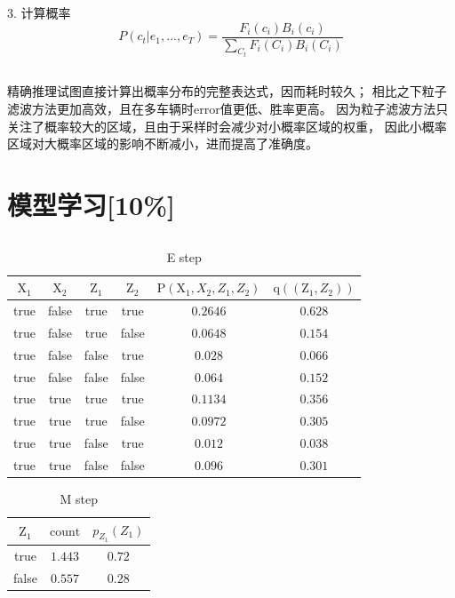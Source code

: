 \documentclass{ctexart}
\begin{document}
	3. 计算概率
	$$P(c_{t}|e_{1},...,e_{T})
	=\frac{F_{i}(c_{i}) B_{i}(c_{i})}{\sum\limits_{C_{t}}F_{i}(C_{i})B_{i}(C_{i})}$$
	\subsection{}
	
精确推理试图直接计算出概率分布的完整表达式，因而耗时较久；
相比之下粒子滤波方法更加高效，且在多车辆时error值更低、胜率更高。
因为粒子滤波方法只关注了概率较大的区域，且由于采样时会减少对小概率区域的权重，
因此小概率区域对大概率区域的影响不断减小，进而提高了准确度。

	\section{模型学习[10\%]}
	\subsection{}
	\begin{table}[H]
		\centering
		\caption{E step}
		\begin{tabular}{|c|c|c|c|c|c|}
		\hline
		$\mathrm{X_1}$ & $\mathrm{X_2}$ & $\mathrm{Z_1}$ & $\mathrm{Z_2}$ & $\mathrm{P}(\mathrm{X_1},X_2,Z_1,Z_2)$ & $\mathrm{q}((\mathrm{Z_1},Z_2))$ \\
		\hline
		true & false & true & true & $0.2646$ & $0.628$ \\
		\hline
		true & false & true & false & $0.0648$ & $0.154$ \\
		\hline
		true & false & false & true & $0.028$ &$0.066$ \\
		\hline
		true & false & false & false & $0.064$ &$0.152$ \\
		\hline
		true & true & true & true & $0.1134$ & $0.356$ \\
		\hline
		true & true & true & false & $0.0972$ & $0.305$ \\
		\hline
		true & true & false & true & $0.012$ & $0.038$ \\
		\hline
		true & true & false & false & $0.096$ & $0.301$ \\
		\hline
		\end{tabular}
	\end{table}
	\begin{table}[H]
		\centering
		\caption{M step}
		
		\begin{tabular}{|c|c|c|}
		\hline
		$\text{Z}_1$ & $\text{count}$ & $p_{Z_1}(Z_1)$ \\
		\hline
		true & $1.443$ & $0.72$ \\
		\hline
		false & $0.557$ & $0.28$ \\
		\hline
		\end{tabular}
	\end{table}	
\end{document}
